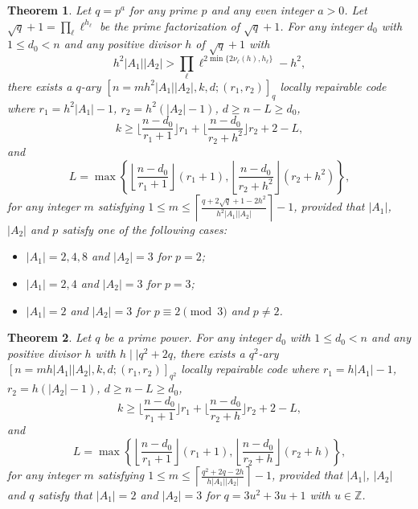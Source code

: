 \documentclass[10pt,a4paper]{amsart}
\newtheorem{theorem}{Theorem}
\begin{document}
\begin{theorem}\label{lrc_two_max_restate}
    Let \( q = p^a \) for any prime \( p \) and any even integer \( a > 0 \). Let \(\sqrt{q}+1 = \prod_\ell \ell^{h_\ell}\)  be the prime factorization of \( \sqrt{q} + 1 \). For any integer \( d_0 \) with \( 1 \leq d_0 < n \) and any positive divisor \( h \) of \( \sqrt{q} + 1 \) with
    \begin{equation}\label{lrc_two_repair_condition}
        h^2|A_1||A_2|>\prod_\ell \ell^{2\min\{2\nu_\ell(h),h_\ell\}}-h^2,
    \end{equation}
    there exists a \( q \)-ary \([n = mh^2|A_1||A_2|, k, d;(r_1,r_2)]_q\) locally repairable code where \( r_1 = h^2|A_1| - 1 \), \(r_2 = h^2(|A_2|-1)\), \(d \ge n - L \ge d_0\), 
    \[
        k \geq \bigg\lfloor\frac{n-d_0}{r_1 + 1}\bigg\rfloor r_1 + \bigg\lfloor\frac{n-d_0}{r_2 + h^2}\bigg\rfloor r_2  + 2 - L,
    \]
    and
    \[
        L = \max\left\{\left\lfloor\frac{n-d_0}{r_1 + 1}\right\rfloor (r_1+1),\left\lfloor\frac{n-d_0}{r_2 + h^2}\right\rfloor (r_2 + h^2)\right\}, 
    \]
    for any integer \( m \) satisfying \(1 \leq m \leq \left\lceil \frac{q+2\sqrt{q}+1-2h^2}{h^2|A_1||A_2|} \right\rceil - 1 \), provided that \(|A_1|\), \(|A_2|\) and \( p \) satisfy one of the following cases:
     
    \begin{itemize}
        \item[(i)] \(|A_1| = 2,4,8\) and \(|A_2| = 3\) for \( p = 2 \);  
        \item[(ii)] \(|A_1| = 2,4\) and \(|A_2| = 3\) for \( p = 3 \);  
        \item[(iii)] \(|A_1| = 2\) and \(|A_2| = 3\) for \( p \equiv 2 \pmod{3} \) and \( p \neq 2 \).
    \end{itemize}
\end{theorem}

\begin{theorem}
    Let \( q \) be a prime power. For any integer \( d_0 \) with \( 1 \leq d_0 < n \) and any positive divisor \( h \) with \(h\mid\mid q^2+2q\), there exists a \( q^2 \)-ary \([n = mh|A_1||A_2|, k, d;(r_1,r_2)]_{q^2}\) locally repairable code where \( r_1 = h|A_1| - 1 \), \(r_2 = h(|A_2|-1)\), \(d \ge n - L \ge d_0\), 
    \[
        k \geq \bigg\lfloor\frac{n-d_0}{r_1 + 1}\bigg\rfloor r_1 + \bigg\lfloor\frac{n-d_0}{r_2 + h}\bigg\rfloor r_2  + 2 - L,
    \]
    and
    \[
        L = \max\left\{\left\lfloor\frac{n-d_0}{r_1 + 1}\right\rfloor (r_1+1),\left\lfloor\frac{n-d_0}{r_2 + h}\right\rfloor (r_2 + h)\right\} , 
    \]
     for any integer \( m \) satisfying \(1 \leq m \leq \left\lceil \frac{q^2+2q-2h}{h|A_1||A_2|} \right\rceil - 1 \), provided that \(|A_1|\), \(|A_2|\) and \( q \) satisfy that \(|A_1| = 2\) and \(|A_2| = 3\) for \(q = 3u^2 + 3u + 1\) with \(u\in\mathbb{Z}\). 
\end{theorem}
\end{document}

